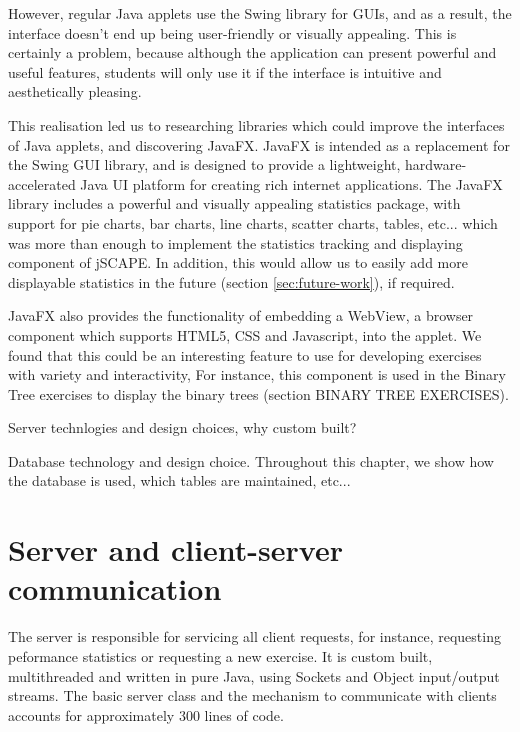 However, regular Java applets use the Swing library for GUIs, and as a result, the interface doesn't end up being user-friendly or visually appealing. This is certainly a problem, because although the application can present powerful and useful features, students will only use it if the interface is intuitive and aesthetically pleasing\cite{Interface-study}. \newline

This realisation led us to researching libraries which could improve the interfaces of Java applets, and discovering JavaFX. JavaFX is intended as a replacement for the Swing GUI library, and is designed to provide a lightweight, hardware-accelerated Java UI platform for creating rich internet applications\cite{JavaFX}. The JavaFX library includes a powerful and visually appealing statistics package, with support for pie charts, bar charts, line charts, scatter charts, tables, etc... which was more than enough to implement the statistics tracking and displaying component of jSCAPE. In addition, this would allow us to easily add more displayable statistics in the future (section \ref{sec:future-work}), if required. \newline

JavaFX also provides the functionality of embedding a \textsf{WebView}, a browser component which supports HTML5, CSS and Javascript, into the applet. We found that this could be an interesting feature to use for developing exercises with variety and interactivity, For instance, this component is used in the Binary Tree exercises to display the binary trees (section BINARY TREE EXERCISES). \newline

Server technlogies and design choices, why custom built?\newline

Database technology and design choice. Throughout this chapter, we show how the database is used, which tables are maintained, etc...

\section{Server and client-server communication}
The server is responsible for servicing all client requests, for instance, requesting peformance statistics or requesting a new exercise. It is custom built, multithreaded and written in pure Java, using Sockets and Object input/output streams.
The basic server class and the mechanism to communicate with clients accounts for approximately 300 lines of code. \newline

